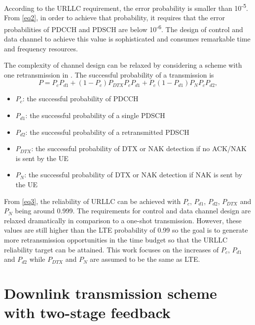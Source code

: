 \documentclass[conference]{IEEEtran}
\begin{document}
According to the URLLC requirement, the error probability is smaller than 10\textsuperscript{-5}. From \eqref{eq2}, in order to achieve that probability, it requires that the error probabilities of PDCCH and PDSCH are below 10\textsuperscript{-6}. The design of control and data channel to achieve this value is sophisticated and consumes remarkable time and frequency resources.

The complexity of channel design can be relaxed by considering a scheme with one retransmission in \cite{b7}. The successful probability of a transmission is
\begin{equation}
P = P_{c}P_{d1} + (1-P_{c})P_{DTX}P_{c}P_{d1} + P_{c}(1-P_{d1})P_{N}P_{c}P_{d2},\label{eq3}
\end{equation}
\begin{itemize}
    \item $P_{c}$: the successful probability of PDCCH
    \item $P_{d1}$: the successful probability of a single PDSCH
    \item $P_{d2}$: the successful probability of a retransmitted PDSCH
    \item $P_{DTX}$: the successful probability of DTX or NAK detection if no ACK/NAK is sent by the UE
    \item $P_{N}$: the successful probability of DTX or NAK detection if NAK is sent by the UE
\end{itemize}

From \eqref{eq3}, the reliability of URLLC can be achieved with $P_{c}$, $P_{d1}$, $P_{d2}$, $P_{DTX}$ and $P_{N}$ being around 0.999. The requirements for control and data channel design are relaxed dramatically in comparison to a one-shot transmission. However, these values are still higher than the LTE probability of 0.99 so the goal is to generate more retransmission opportunities in the time budget  so  that  the  URLLC  reliability  target  can be attained. This work focuses on the increases of $P_{c}$, $P_{d1}$ and $P_{d2}$ while $P_{DTX}$ and $P_{N}$ are assumed to be the same as LTE.

\section{Downlink transmission scheme with two-stage feedback}
\end{document}
